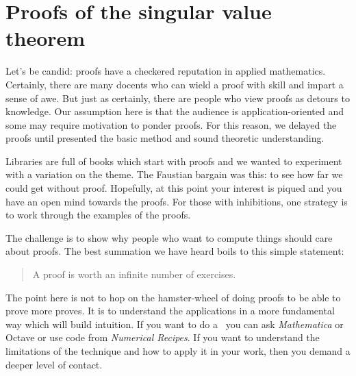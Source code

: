 \chapter{Proofs of the singular value theorem}
Let's be candid: proofs have a checkered reputation in applied mathematics. Certainly, there are many docents who can wield a proof with skill and impart a sense of awe. But just as certainly, there are people who view proofs as detours to knowledge. Our assumption here is that the audience is application-oriented and some may require motivation to ponder proofs. For this reason, we delayed the proofs until presented the basic method and sound theoretic understanding. 

Libraries are full of books which start with proofs and we wanted to experiment with a variation on the theme. The Faustian bargain was this: to see how far we could get without proof. Hopefully, at this point your interest is piqued and you have an open mind towards the proofs. For those with inhibitions, one strategy is to work through the examples of the proofs.

The challenge is to show why people who want to compute things should care about proofs. The best summation we have heard boils to this simple statement:
\begin{quotation}
 A proof is worth an infinite number of exercises.
\end{quotation}
The point here is not to hop on the hamster-wheel of doing proofs to be able to prove more proves. It is to understand the applications in a more fundamental way which will build intuition. If you want to do a \svdl \  you can ask \emph{Mathematica} or Octave or use code from \emph{Numerical Recipes}. If you want to understand the limitations of the technique and how to apply it in your work, then you demand a deeper level of contact.





\endinput